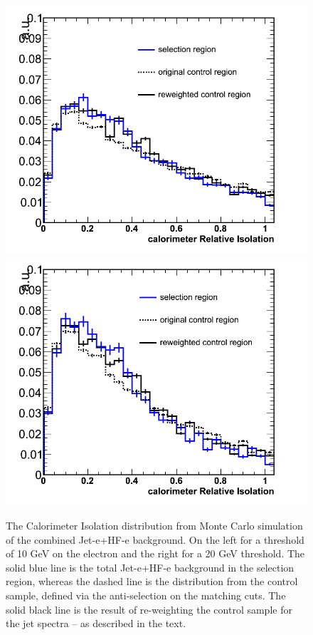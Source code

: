 \begin{figure}[h!]
\centering
\includegraphics[scale=0.28]{Plots/caloIso_pt10_fakes.png}
\includegraphics[scale=0.28]{Plots/caloIso_pt20_fakes.png}
\caption{The Calorimeter Isolation distribution from Monte Carlo simulation of the combined Jet-e+HF-e background.   On the left for a threshold of 10 GeV on the electron and the right for a 20 GeV threshold.  The solid blue line is the total Jet-e+HF-e background in the selection region, whereas the dashed line is the distribution from the control sample, defined via the anti-selection on the matching cuts.  The solid black line is the result of re-weighting the control sample for the jet spectra -- as described in the text.}\label{fig:caloIso_fakes}
\end{figure}

